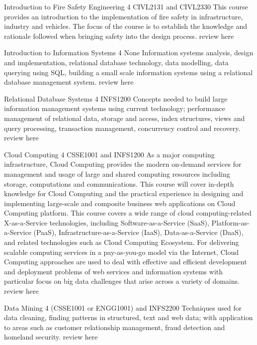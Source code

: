 	{Introduction to Fire Safety Engineering}
	{4}
	{CIVL2131 and CIVL2330}
	{}
	{}
	{This course provides an introduction to the implementation of fire safety in infrastructure, industry and vehicles. The focus of the course is to establish the knowledge and rationale followed when bringing safety into the design process.}
	{review here}

	{Introduction to Information Systems}
	{4}
	{None}
	{}
	{}
	{Information systems analysis, design and implementation, relational database technology, data modelling, data querying using SQL, building a small scale information systems using a relational database management system.}
	{review here}

	{Relational Database Systems}
	{4}
	{INFS1200}
	{}
	{}
	{Concepts needed to build large information management systems using current technology; performance management of relational data, storage and access, index structures, views and query processing, transaction management, concurrency control and recovery.}
	{review here}

	{Cloud Computing}
	{4}
	{CSSE1001 and INFS1200}
	{}
	{}
	{As a major computing infrastructure, Cloud Computing provides the modern on-demand services for management and usage of large and shared computing resources including storage, computations and communications. This course will cover in-depth knowledge for Cloud Computing and the practical experience in designing and implementing large-scale and composite business web applications on Cloud Computing platform. This course covers a wide range of cloud computing-related X-as-a-Service technologies, including Software-as-a-Service (SaaS), Platform-as-a-Service (PaaS), Infrastructure-as-a-Service (IaaS), Data-as-a-Service (DaaS), and related technologies such as Cloud Computing Ecosystem. For delivering scalable computing services in a pay-as-you-go model via the Internet, Cloud Computing approaches are used to deal with effective and efficient development and deployment problems of web services and information systems with particular focus on big data challenges that arise across a variety of domains.}
	{review here}

	{Data Mining}
	{4}
	{(CSSE1001 or ENGG1001) and INFS2200}
	{}
	{}
	{Techniques used for data cleaning, finding patterns in structured, text and web data; with application to areas such as customer relationship management, fraud detection and homeland security.}
	{review here}

